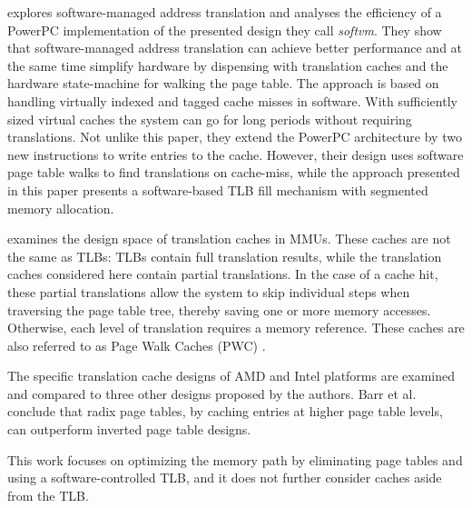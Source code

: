 \textbf{\cite{jacobSoftwaremanagedAddressTranslation1997}} explores software-managed address translation and analyses the efficiency of a PowerPC implementation
of the presented design they call \textit{softvm}. They show that
software-managed address translation can achieve better performance and
at the same time simplify hardware by dispensing with translation caches and
the hardware state-machine for walking the page table.
The approach is based on handling virtually indexed and tagged cache misses in
software.
With sufficiently sized virtual caches the system can go for long periods
without requiring translations.
Not unlike this paper, they extend the PowerPC architecture by two new instructions
to write entries to the cache. However, their design uses software page table
walks to find translations on cache-miss, while the approach presented in this
paper presents a software-based TLB fill mechanism with segmented
memory allocation.


\textbf{\cite{barrTranslationCachingSkip}} examines the design space of translation caches in MMUs. These caches are not the same as TLBs: TLBs contain full translation results, while the translation caches considered here contain partial translations. In the case of a cache hit, these partial translations allow the system to skip individual steps when traversing the page table tree, thereby saving one or more memory accesses. Otherwise, each level of translation requires a memory reference. These caches are also referred to as Page Walk Caches (PWC) \cite{yaniv2016hash}.

The specific translation cache designs of AMD and Intel platforms are examined and compared to three other designs proposed by the authors. Barr et al. conclude that radix page tables, by caching entries at higher page table levels, can outperform inverted page table designs.

This work focuses on optimizing the memory path by eliminating page tables and using a software-controlled TLB, and it does not further consider caches aside from the TLB.




